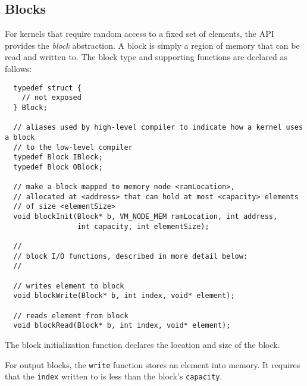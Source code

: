 

\subsection{Blocks}
\label{sec:blocks}

For kernels that require random access to a fixed set of elements, the
API provides the {\it block} abstraction.  A block is simply a region
of memory that can be read and written to.  The block type and
supporting functions are declared as follows:

{\small
\begin{verbatim}
  typedef struct {
    // not exposed
  } Block;

  // aliases used by high-level compiler to indicate how a kernel uses a block
  // to the low-level compiler
  typedef Block IBlock;
  typedef Block OBlock;

  // make a block mapped to memory node <ramLocation>, 
  // allocated at <address> that can hold at most <capacity> elements
  // of size <elementSize>
  void blockInit(Block* b, VM_NODE_MEM ramLocation, int address, 
                 int capacity, int elementSize);

  //
  // block I/O functions, described in more detail below:
  //

  // writes element to block
  void blockWrite(Block* b, int index, void* element);

  // reads element from block
  void blockRead(Block* b, int index, void* element); \end{verbatim}}

 The block initialization function
declares the location and size of the block.


 For output blocks, the {\tt write} function stores
an element into memory.  It requires that the {\tt index} written to
is less than the block's {\tt capacity}.

